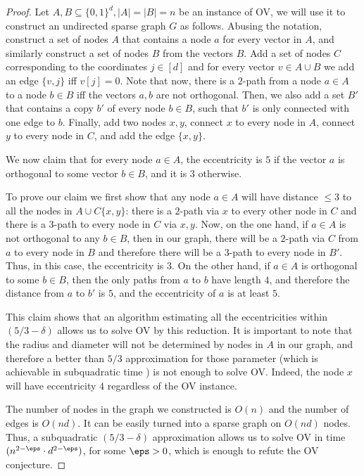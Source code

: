 \begin{proof}
Let $A,B \subseteq \{0,1\}^d, |A|=|B|=n$ be an instance of OV, we will use it to construct an undirected sparse graph $G$ as follows.
Abusing the notation, construct a set of nodes $A$ that contains a node $a$ for every vector in $A$, and similarly construct a set of nodes $B$ from the vectors $B$.
Add a set of nodes $C$ corresponding to the coordinates $j \in [d]$ and for every vector $v \in A \cup B$ we add an edge $\{v,j\}$ iff $v[j]=0$.
Note that now, there is a $2$-path from a node $a \in A$ to a node $b\in B$ iff the vectors $a,b$ are not orthogonal.
Then, we also add a set $B'$ that contains a copy $b'$ of every node $b \in B$, such that $b'$ is only connected with one edge to $b$.
Finally, add two nodes $x,y$, connect $x$ to every node in $A$, connect $y$ to every node in $C$, and add the edge $\{x,y\}$.

We now claim that for every node $a\in A$, the eccentricity is $5$ if the vector $a$ is orthogonal to some vector $b \in B$, and it is $3$ otherwise.

To prove our claim we first show that any node $a \in A$ will have distance $\leq 3$ to all the nodes in $A \cup C \{x,y\}$:
there is a $2$-path via $x$ to every other node in $C$ and there is a $3$-path to every node in $C$ via $x,y$.
Now, on the one hand, if $a \in A$ is not orthogonal to any $b\in B$, then in our graph, there will be a $2$-path via $C$ from $a$ to every node in $B$ and therefore there will be a $3$-path to every node in $B'$.
Thus, in this case, the eccentricity is $3$.
On the other hand, if $a \in A$ is orthogonal to some $b \in B$, then the only paths from $a$ to $b$ have length $4$, and therefore the distance from $a$ to $b'$ is $5$, and the eccentricity of $a$ is at least $5$.

This claim shows that an algorithm estimating all the eccentricities within $(5/3-\delta)$ allows us to solve OV by this reduction.
It is important to note that the radius and diameter will not be determined by nodes in $A$ in our graph, and therefore a better than $5/3$ approximation for those parameter (which is achievable in subquadratic time \cite{RV13}) is not enough to solve OV.
Indeed, the node $x$ will have eccentricity $4$ regardless of the OV instance.

The number of nodes in the graph we constructed is $O(n)$ and the number of edges is $O(nd)$.
It can be easily turned into a sparse graph on $O(nd)$ nodes.
Thus, a subquadratic $(5/3-\delta)$ approximation allows us to solve OV in time $(n^{2-\eps} \cdot d^{2-\eps})$, for some $\eps>0$, which is enough to refute the OV conjecture.

\end{proof}


